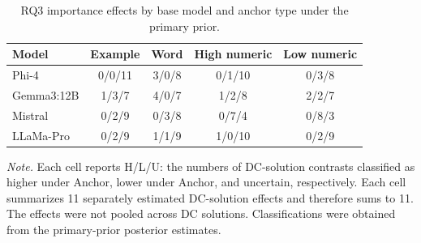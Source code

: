 \begin{table}[tbp]
\caption{RQ3 importance effects by base model and anchor type under the primary prior.}
\label{tab:rq3_importance_primary_compact}
\begin{tabular}{lcccc}
\toprule
Model & Example & Word & High numeric & Low numeric \\
\midrule
Phi-4 & 0/0/11 & 3/0/8 & 0/1/10 & 0/3/8 \\
Gemma3:12B & 1/3/7 & 4/0/7 & 1/2/8 & 2/2/7 \\
Mistral & 0/2/9 & 0/3/8 & 0/7/4 & 0/8/3 \\
LLaMa-Pro & 0/2/9 & 1/1/9 & 1/0/10 & 0/2/9 \\
\bottomrule
\end{tabular}
\vspace{2pt}
\begin{minipage}{\linewidth}
\footnotesize\textit{Note.} Each cell reports H/L/U: the numbers of DC-solution contrasts classified as higher under Anchor, lower under Anchor, and uncertain, respectively. Each cell summarizes 11 separately estimated DC-solution effects and therefore sums to 11. The effects were not pooled across DC solutions. Classifications were obtained from the primary-prior posterior estimates.
\end{minipage}
\end{table}
